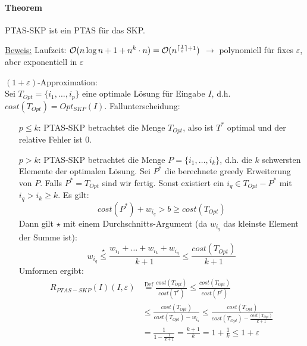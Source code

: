 \paragraph{Theorem}
PTAS-SKP ist ein PTAS für das SKP.

\underline{Beweis:}
Laufzeit: $\mathcal{O}(n \log n + 1 + n^k \cdot n) = \mathcal{O}(n^{\lceil \frac{1}{\varepsilon} \rceil + 1})$
$\rightarrow$ polynomiell für fixes $\varepsilon$, aber exponentiell in $\varepsilon$

$(1+\varepsilon)$-Approximation: \\
Sei $T_{Opt} = \{i_1, \dots, i_p\}$ eine optimale Lösung für Eingabe $I$, d.h. $cost(T_{Opt})=Opt_{SKP}(I)$.
Fallunterscheidung:
\begin{itemize}
    \item[$p \leq k$:] PTAS-SKP betrachtet die Menge $T_{Opt}$, also ist $T^*$ optimal und der relative Fehler ist 0.
    \item[$p > k$:] PTAS-SKP betrachtet die Menge $P=\{i_1, \dots, i_k\}$, d.h. die $k$ schwersten Elemente
    der optimalen Lösung.
    Sei $P^*$ die berechnete greedy Erweiterung von $P$. Falls $P^* = T_{Opt}$ sind wir fertig.
    Sonst existiert ein $i_q \in T_{Opt}-P^*$ mit $i_q > i_k \geq k$. Es gilt:
    $$ cost(P^*) + w_{i_q} > b \geq cost(T_{Opt}) $$
    Dann gilt $\star$ mit einem Durchschnitts-Argument (da $w_{i_q}$ das kleinste Element der Summe ist):
    $$ w_{i_q} \overset{\star}{\leq} \frac{ w_{i_1} + \dots + w_{i_k} + w_{i_q} }{k+1} \leq \frac{cost(T_{Opt})}{k+1} $$
    Umformen ergibt:
    \begin{align*}
    R_{PTAS-SKP}(I)(I, \varepsilon) & \overset{\text{Def}}{=} \frac{cost(T_{Opt})}{cost(T^*)}
    \leq \frac{cost(T_{Opt})}{cost(P^*)} \\
    & \leq \frac{cost(T_{Opt})}{cost(T_{Opt}) - w_{i_q}}
    \leq \frac{cost(T_{Opt})}{cost(T_{Opt}) - \frac{cost(T_{Opt})}{k+1} } \\
    & = \frac{1}{1 - \frac{1}{k+1} } = \frac{k+1}{k} = 1 + \frac{1}{k} \leq 1 + \varepsilon
    \end{align*}
\end{itemize}


